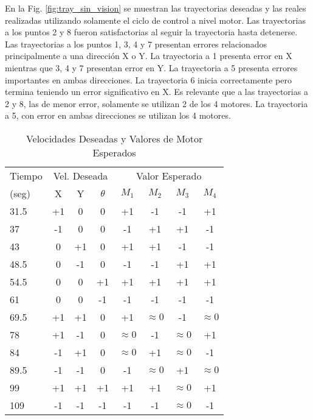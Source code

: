{En la Fig. \ref{fig:tray_sin_vision} se muestran las trayectorias deseadas y las reales realizadas utilizando solamente el ciclo de control a nivel motor. Las trayectorias a los puntos 2 y 8 fueron satisfactorias al seguir la trayectoria hasta detenerse. Las trayectorias a los puntos 1, 3, 4 y 7 presentan errores relacionados principalmente a una dirección X o Y. La trayectoria a 1 presenta error en X mientras que 3, 4 y 7 presentan error en Y. La trayectoria a 5 presenta errores importantes en ambas direcciones. La trayectoria 6 inicia correctamente pero termina teniendo un error significativo en X. Es relevante que a las trayectorias a 2 y 8, las de menor error, solamente se utilizan 2 de los 4 motores. La trayectoria a 5, con error en ambas direcciones se utilizan los 4 motores. \par




\begin{table}
\centering
\caption{Velocidades Deseadas y Valores de Motor Esperados}
\begin{tabular}{l||c c c|| c c c c }
Tiempo & \multicolumn{3}{c||}{Vel. Deseada} & \multicolumn{4}{c}{Valor Esperado} \\
(seg)     & X & Y & \(\theta\) & \(M_1\) & \(M_2\) & \(M_3\) & \(M_4\) \\
\hline
31.5 	& +1 &  0 &  0 & +1 & -1 & -1 & +1 \\
37      & -1 &  0 &  0 & -1 & +1 & +1 & -1 \\
43      &  0 & +1 &  0 & +1 & +1 & -1 & -1 \\
48.5    &  0 & -1 &  0 & -1 & -1 & +1 & +1 \\
54.5 	&  0 &  0 & +1 & +1 & +1 & +1 & +1 \\
61      &  0 &  0 & -1 & -1 & -1 & -1 & -1 \\
69.5    & +1 & +1 &  0 & +1 &\(\approx0\)& -1 &\(\approx0\)\\
78      & +1 & -1 &  0 &\(\approx0\)& -1 &\(\approx0\)& +1 \\
84	    & -1 & +1 &  0 &\(\approx0\)& +1 &\(\approx0\)& -1 \\
89.5    & -1 & -1 &  0 & -1 &\(\approx0\)& +1 &\(\approx0\)\\
99      & +1 & +1 & +1 & +1 & +1 & \(\approx0\) & +1 \\
109     & -1 & -1 & -1 & -1 & -1 & \(\approx0\) & -1 \\
\end{tabular}
\label{table:vels_1-0}
\end{table}

}
